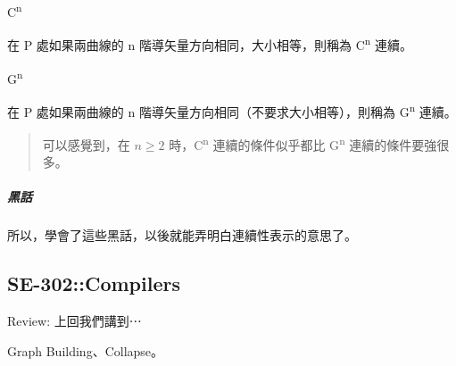 \documentclass[
]{article}
\begin{document}
C\textsuperscript{n}

在 P 處如果兩曲線的 n 階導矢量方向相同，大小相等，則稱為
C\textsuperscript{n} 連續。

G\textsuperscript{n}

在 P 處如果兩曲線的 n 階導矢量方向相同（不要求大小相等），則稱為
G\textsuperscript{n} 連續。

\begin{quote}
可以感覺到，在 \(n \ge 2\) 時，C\textsuperscript{n} 連續的條件似乎都比
G\textsuperscript{n} 連續的條件要強很多。
\end{quote}

\hypertarget{header-n205}{%
\subparagraph{黑話}\label{header-n205}}

所以，學會了這些黑話，以後就能弄明白連續性表示的意思了。

\hypertarget{header-n207}{%
\subsection{SE-302::Compilers}\label{header-n207}}

Review: 上回我們講到⋯

Graph Building、Collapse。
\end{document}
